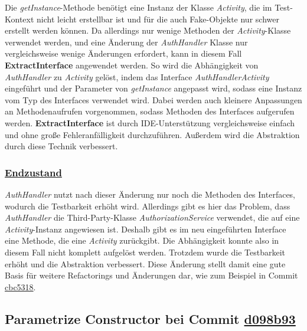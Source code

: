 Die \textit{getInstance}-Methode benötigt eine Instanz der Klasse \textit{Activity}, die im Test-Kontext nicht leicht erstellbar ist und für die auch Fake-Objekte nur schwer erstellt werden können. Da allerdings nur wenige Methoden der \textit{Activity}-Klasse verwendet werden, und eine Änderung der \textit{AuthHandler} Klasse nur vergleichsweise wenige Änderungen erfordert, kann in diesem Fall \textbf{ExtractInterface} angewendet werden.
So wird die Abhängigkeit von \textit{AuthHandler} zu \textit{Activity} gelöst, indem das Interface \textit{AuthHandlerActivity} eingeführt und der Parameter von \textit{getInstance} angepasst wird, sodass eine Instanz vom Typ des Interfaces verwendet wird. Dabei werden auch kleinere Anpassungen an Methodenaufrufen vorgenommen, sodass Methoden des Interfaces aufgerufen werden.
\textbf{ExtractInterface} ist durch IDE-Unterstützung vergleichsweise einfach und ohne große Fehleranfälligkeit durchzuführen. Außerdem wird die Abstraktion durch diese Technik verbessert.

\subsubsection*{\href{https://github.com/lukaspanni/OpenSourceStats/tree/1e47e7b2d42c04429a433a6ac3dbea781409d36d/app/src/main/java/de/lukaspanni/opensourcestats/auth/}{Endzustand}}

\textit{AuthHandler} nutzt nach dieser Änderung nur noch die Methoden des Interfaces, wodurch die Testbarkeit erhöht wird.
Allerdings gibt es hier das Problem, dass \textit{AuthHandler} die Third-Party-Klasse \textit{AuthorizationService} verwendet, die auf eine \textit{Activity}-Instanz angewiesen ist.
Deshalb gibt es im neu eingeführten Interface eine Methode, die eine \textit{Activity} zurückgibt. Die Abhängigkeit konnte also in diesem Fall nicht komplett aufgelöst werden.
Trotzdem wurde die Testbarkeit erhöht und die Abstraktion verbessert. Diese Änderung stellt damit eine gute Basis für weitere Refactorings und Änderungen dar, wie zum Beispiel in Commit \href{https://github.com/lukaspanni/OpenSourceStats/commit/cbc53183a878d6507a02daebd55c9c7dfcae9c0f}{cbc5318}.

\newpage

\subsection{Parametrize Constructor bei Commit \href{https://github.com/lukaspanni/OpenSourceStats/commit/d098b93ffd042cb095af679254ed01584417763e} {d098b93}}

